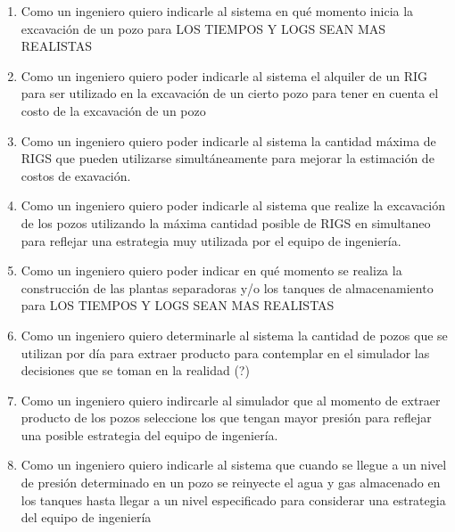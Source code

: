 \begin{enumerate}
  \item Como un ingeniero quiero indicarle al sistema en qué momento inicia la excavación de un pozo para LOS TIEMPOS Y LOGS SEAN MAS REALISTAS
  \item Como un ingeniero quiero poder indicarle al sistema el alquiler de un RIG para ser utilizado en la excavación de un cierto pozo para tener en cuenta el costo de la excavación de un pozo
  \item Como un ingeniero quiero poder indicarle al sistema la cantidad máxima de RIGS que pueden utilizarse simultáneamente para mejorar la estimación de costos de exavación.
  \item Como un ingeniero quiero poder indicarle al sistema que realize la excavación de los pozos utilizando la máxima cantidad posible de RIGS en simultaneo para reflejar una estrategia muy utilizada por el equipo de ingeniería.
  \item Como un ingeniero quiero poder indicar en qué momento se realiza la construcción de las plantas separadoras y/o los tanques de almacenamiento para LOS TIEMPOS Y LOGS SEAN MAS REALISTAS
  \item Como un ingeniero quiero determinarle al sistema la cantidad de pozos que se utilizan por día para extraer producto para contemplar en el simulador las decisiones que se toman en la realidad (?)
  \item Como un ingeniero quiero indircarle al simulador que al momento de extraer producto de los pozos seleccione los que tengan mayor presión para reflejar una posible estrategia del equipo de ingeniería.
  \item Como un ingeniero quiero indicarle al sistema que cuando se llegue a un nivel de presión determinado en un pozo se reinyecte el agua y gas almacenado en los tanques hasta llegar a un nivel especificado para considerar una estrategia del equipo de ingeniería
\end{enumerate}
